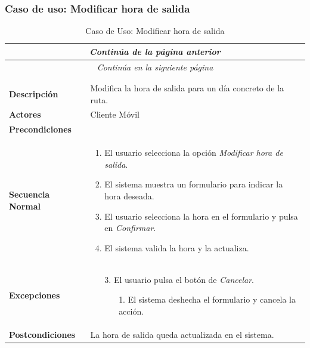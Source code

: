\newpage
\subsubsection*{Caso de uso: Modificar hora de salida }
\begin{longtable}{| p{4cm} | p{10cm} |}
\endfirsthead
\multicolumn{2}{c}{\textit{Continúa de la página anterior}}\\[12pt]
\hline
\endhead
\hline
\multicolumn{2}{c}{\textit{Continúa en la siguiente página}} \\
\endfoot
\hline
\caption{Caso de Uso: Modificar hora de salida}\label{fig:1}\\
\endlastfoot


\hline
\multicolumn{2}{|c|}{\textbf{CU$<$15$>$ - Modificar Hora de Salida}} \\

\hline
\textbf{Descripción} &
Modifica la hora de salida para un día concreto de la ruta.\\

\hline
\textbf{Actores} &
Cliente Móvil\\

\hline
\textbf{Precondiciones} &
\\

\hline
\textbf{Secuencia Normal} &\mbox{}\par\vspace{-\baselineskip}
\begin{enumerate}[leftmargin=0.7cm, topsep=0.1cm]
\item El usuario selecciona la opción \textit{Modificar hora de salida}.
\item El sistema muestra un formulario para indicar la hora deseada.
\item El usuario selecciona la hora en el formulario y pulsa en \textit{Confirmar}.
\item El sistema valida la hora y la actualiza.
\end{enumerate}


\\
\hline
\textbf{Excepciones} &\mbox{}\par\vspace{-\baselineskip}
\begin{enumerate}[leftmargin=0.9cm, topsep=0.1cm]
\item[3.] El usuario pulsa el botón de \textit{Cancelar}.
	\begin{itemize}
	\item[1.] El sistema deshecha el formulario y cancela la acción.
	\end{itemize}
\end{enumerate}
\\

\hline
\textbf{Postcondiciones} & 
La hora de salida queda actualizada en el sistema.\\
\hline
\end{longtable}



